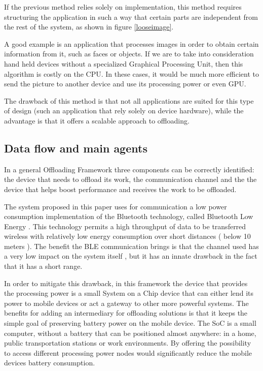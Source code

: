 \begin{enumerate}
If the previous method relies solely on implementation, this method requires structuring the application in such a way that certain parts are independent from the rest of the system, as shown in figure \ref{looseimage}.

A good example is an application that processes images in order to obtain certain information from it, such as faces or objects. If we are to take into consideration hand held devices without a specialized Graphical Processing Unit, then this algorithm is costly on the CPU. In these cases, it would be much more efficient to send the picture to another device and use its processing power or even GPU.

The drawback of this method is that not all applications are suited for this type of design (such an application that rely solely on device hardware), while the advantage is that it offers a scalable approach to offloading.

\end{enumerate}


\subsection{Data flow and main agents}
\label{dataflow}

In a general Offloading Framework three components can be correctly identified: the device that needs to offload its work, the communication channel and the the device that helps boost performance and receives the work to be offloaded.

The system proposed in this paper uses for communication a low power consumption implementation of the Bluetooth technology, called Bluetooth Low Energy \cite{BLE2}. This technology permits a high throughput of data to be transferred wireless with relatively low energy consumption over short distances ( below 10 meters ). The benefit the BLE communication brings is that the channel used has a very low impact on the system itself \cite{BLE}, but it has an innate drawback in the fact that it has a short range.

In order to mitigate this drawback, in this framework the device that provides the processing power is a small System on a Chip device that can either lend its power to mobile devices or act a gateway to other more powerful systems. The benefits for adding an intermediary for offloading solutions is that it keeps the simple goal of preserving battery power on the mobile device. The SoC is a small computer, without a battery that can be positioned almost anywhere: in a home, public transportation stations or work environments. By offering the possibility to access different processing power nodes would significantly reduce the mobile devices battery consumption.

